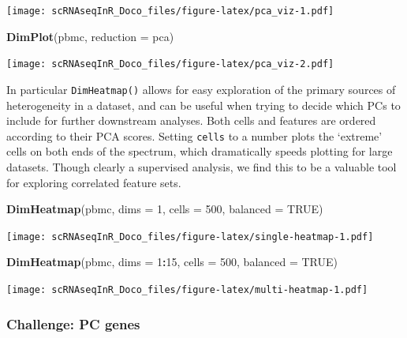\documentclass[
]{book}
\newenvironment{Shaded}{\begin{snugshade}}{\end{snugshade}}
\newcommand{\AttributeTok}[1]{\textcolor[rgb]{0.13,0.29,0.53}{#1}}
\newcommand{\ConstantTok}[1]{\textcolor[rgb]{0.56,0.35,0.01}{#1}}
\newcommand{\DecValTok}[1]{\textcolor[rgb]{0.00,0.00,0.81}{#1}}
\newcommand{\FunctionTok}[1]{\textcolor[rgb]{0.13,0.29,0.53}{\textbf{#1}}}
\newcommand{\NormalTok}[1]{#1}
\newcommand{\SpecialCharTok}[1]{\textcolor[rgb]{0.81,0.36,0.00}{\textbf{#1}}}
\newcommand{\StringTok}[1]{\textcolor[rgb]{0.31,0.60,0.02}{#1}}
\begin{document}
\texttt{[image: scRNAseqInR\_Doco\_files/figure-latex/pca\_viz-1.pdf]}

\begin{Shaded}
\begin{Highlighting}[]
\FunctionTok{DimPlot}\NormalTok{(pbmc, }\AttributeTok{reduction =} \StringTok{\textquotesingle{}pca\textquotesingle{}}\NormalTok{)}
\end{Highlighting}
\end{Shaded}

\texttt{[image: scRNAseqInR\_Doco\_files/figure-latex/pca\_viz-2.pdf]}

In particular \texttt{DimHeatmap()} allows for easy exploration of the primary sources of heterogeneity in a dataset, and can be useful when trying to decide which PCs to include for further downstream analyses. Both cells and features are ordered according to their PCA scores. Setting \texttt{cells} to a number plots the `extreme' cells on both ends of the spectrum, which dramatically speeds plotting for large datasets. Though clearly a supervised analysis, we find this to be a valuable tool for exploring correlated feature sets.

\begin{Shaded}
\begin{Highlighting}[]
\FunctionTok{DimHeatmap}\NormalTok{(pbmc, }\AttributeTok{dims =} \DecValTok{1}\NormalTok{, }\AttributeTok{cells =} \DecValTok{500}\NormalTok{, }\AttributeTok{balanced =} \ConstantTok{TRUE}\NormalTok{)}
\end{Highlighting}
\end{Shaded}

\texttt{[image: scRNAseqInR\_Doco\_files/figure-latex/single-heatmap-1.pdf]}

\begin{Shaded}
\begin{Highlighting}[]
\FunctionTok{DimHeatmap}\NormalTok{(pbmc, }\AttributeTok{dims =} \DecValTok{1}\SpecialCharTok{:}\DecValTok{15}\NormalTok{, }\AttributeTok{cells =} \DecValTok{500}\NormalTok{, }\AttributeTok{balanced =} \ConstantTok{TRUE}\NormalTok{)}
\end{Highlighting}
\end{Shaded}

\texttt{[image: scRNAseqInR\_Doco\_files/figure-latex/multi-heatmap-1.pdf]}

\hypertarget{challenge-pc-genes}{%
\subsubsection*{Challenge: PC genes}\label{challenge-pc-genes}}
\end{document}

